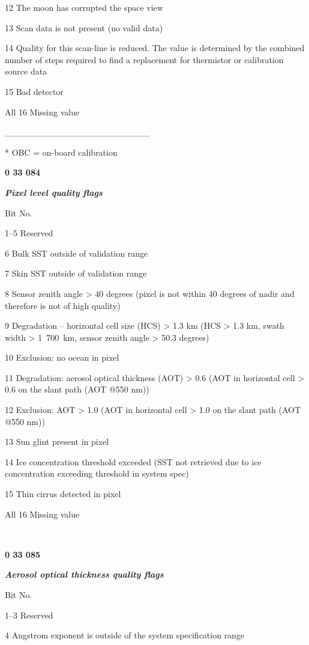 12 The moon has corrupted the space view

13 Scan data is not present (no valid data)

14 Quality for this scan-line is reduced. The value is determined by the combined number of steps required to find a replacement for thermistor or calibration source data

15 Bad detector

All 16 Missing value

\_\_\_\_\_\_\_\_\_\_\_\_\_\_\_\_\_\_\_\_\_\_\_

* OBC = on-board calibration

\textbf{0 33 084}

\emph{\textbf{Pixel level quality flags}}

Bit No.

1--5 Reserved

6 Bulk SST outside of validation range

7 Skin SST outside of validation range

8 Sensor zenith angle \textgreater{} 40 degrees (pixel is not within 40 degrees of nadir and therefore is not of high quality)

9 Degradation -- horizontal cell size (HCS) \textgreater{} 1.3 km (HCS \textgreater{} 1.3 km, swath width \textgreater{} 1~700~km, sensor zenith angle \textgreater{} 50.3 degrees)

10 Exclusion: no ocean in pixel

11 Degradation: aerosol optical thickness (AOT) \textgreater{} 0.6 (AOT in horizontal cell \textgreater{} 0.6 on the slant path (AOT @550 nm))

12 Exclusion: AOT \textgreater{} 1.0 (AOT in horizontal cell \textgreater{} 1.0 on the slant path (AOT @550 nm))

13 Sun glint present in pixel

14 Ice concentration threshold exceeded (SST not retrieved due to ice concentration exceeding threshold in system spec)

15 Thin cirrus detected in pixel

All 16 Missing value

\textbf{\\
}

\textbf{0 33 085}

\emph{\textbf{Aerosol optical thickness quality flags}}

Bit No.

1--3 Reserved

4 Angstrom exponent is outside of the system specification range

